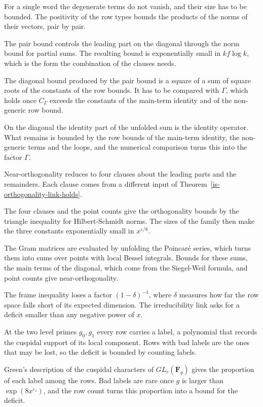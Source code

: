 For a single word the degenerate terms do not vanish, and their size has to be bounded. The
positivity of the row types bounds the products of the norms of their vectors, pair by pair.

The pair bound controls the leading part on the diagonal through the norm bound for partial sums.
The resulting bound is exponentially small in $kf\log k$, which is the form the combination of the
clauses needs.

The diagonal bound produced by the pair bound is a square of a sum of square roots of the constants of
the row bounds. It has to be compared with $\Gamma$, which holds once $C_\Gamma$ exceeds the
constants of the main-term identity and of the non-generic row bound.

On the diagonal the identity part of the unfolded sum is the identity operator. What remains is
bounded by the row bounds of the main-term identity, the non-generic terms and the loops, and the
numerical comparison turns this into the factor $\Gamma$.

Near-orthogonality reduces to four clauses about the leading parts and the remainders. Each clause
comes from a different input of Theorem~\ref{is-orthogonality-link-holds}.

The four clauses and the point counts give the orthogonality bounds by the triangle inequality for
Hilbert-Schmidt norms. The sizes of the family then make the three constants exponentially small in
$x^{\varepsilon/8}$.

The Gram matrices are evaluated by unfolding the Poincaré series, which turns them into sums over
points with local Bessel integrals. Bounds for these sums, the main terms of the diagonal, which come
from the Siegel-Weil formula, and point counts give near-orthogonality.

The frame inequality loses a factor $(1-\delta)^{-1}$, where $\delta$ measures how far the row space
falls short of its expected dimension. The irreducibility link asks for a deficit smaller than any
negative power of $x$.

At the two level primes $g_0,g_1$ every row carries a label, a polynomial that records the cuspidal
support of its local component. Rows with bad labels are the ones that may be lost, so the deficit is
bounded by counting labels.

Green's description of the cuspidal characters of $GL_r(\mathbf F_g)$ \cite{Gre55} gives the
proportion of each label among the rows. Bad labels are rare once $g$ is larger than
$\exp(8x^{\varepsilon_z})$, and the row count turns this proportion into a bound for the deficit.
